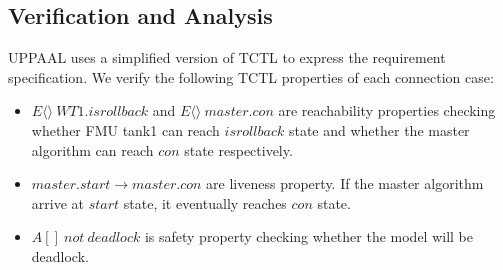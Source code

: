\subsection{Verification and Analysis}
UPPAAL uses a simplified version of TCTL \cite{BouchenebGR09} to express the requirement specification. We verify the following TCTL properties of each connection case:
\begin{itemize}
\item
$E\langle\rangle~WT1.isrollback$ and $E\langle\rangle~master.con$ are reachability properties checking whether FMU tank1 can reach $isrollback$ state and whether the master algorithm can reach $con$ state respectively.
\item
$master.start \rightarrow master.con$ are liveness property. If the master algorithm arrive at $start$ state, it eventually reaches $con$ state.
\item 
$A[]~not~deadlock$ is safety property checking whether the model will be deadlock.
\end{itemize}

